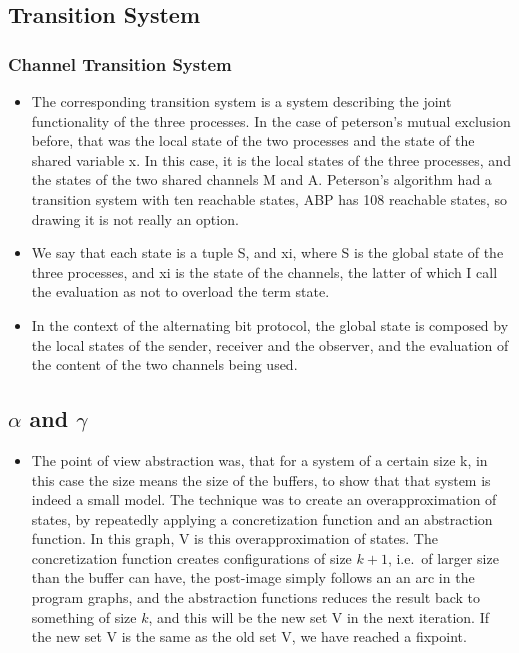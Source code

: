 \documentclass[handout]{beamer}
\begin{document}
\begin{footnotesize}
\subsection{Transition System}
\begin{frame}
  \frametitle{Channel Transition System}
  \begin{itemize}
  \item
The corresponding transition system is a system describing the joint functionality of the three processes. In the case of peterson's mutual exclusion before, that was the local state of the two processes and the state of the shared variable x. In this case, it is the local states of the three processes, and the states of the two shared channels M and A. Peterson's algorithm had a transition system with ten reachable states, ABP has 108 reachable states, so drawing it is not really an option.
\item
We say that each state is a tuple S, and xi, where S is the global state of the three processes, and xi is the state of the channels, the latter of which I call the evaluation as not to overload the term state.
\item
In the context of the alternating bit protocol, the global state is composed by the local states of the sender, receiver and the observer, and the evaluation of the content of the two channels being used.
  \end{itemize}
\end{frame}

\subsection{$\alpha$ and $\gamma$}
\begin{frame}
\begin{itemize}
\item
The point of view abstraction was, that for a system of a certain size k, in this case the size means the size of the buffers, to show that that system is indeed a small model. The technique was to create an overapproximation of states, by repeatedly applying a concretization function and an abstraction function. In this graph, V is this overapproximation of states. The concretization function creates configurations of size $k+1$, i.e.\ of larger size than the buffer can have, the post-image simply follows an an arc in the program graphs, and the abstraction functions reduces the result back to something of size $k$, and this will be the new set V in the next iteration. If the new set V is the same as the old set V, we have reached a fixpoint.
\end{itemize}
\end{frame}


\end{footnotesize}
\end{document}
